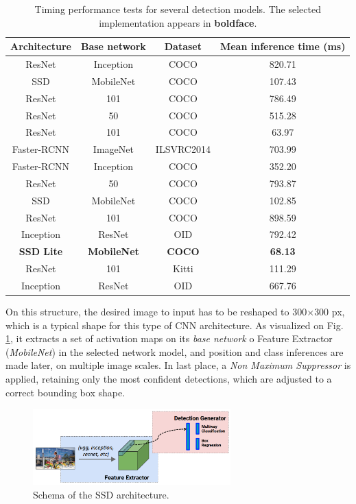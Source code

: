 \begin{table}[h]
	\centering
	\begin{tabular}{|c|c|c|c|}
		\hline
		\textbf{Architecture} & \textbf{Base network} & \textbf{Dataset} & \textbf{Mean inference time} (ms) \\ \hline
		ResNet  & Inception  & COCO & 820.71 \\ \hline
		SSD  & MobileNet  & COCO & 107.43 \\ \hline
		ResNet  & 101  & COCO & 786.49 \\ \hline
		ResNet  & 50  & COCO & 515.28 \\ \hline
		ResNet  & 101  & COCO & 63.97 \\ \hline
		Faster-RCNN  & ImageNet  & ILSVRC2014 & 703.99 \\ \hline
		Faster-RCNN  & Inception  & COCO & 352.20 \\ \hline
		ResNet  & 50  & COCO & 793.87 \\ \hline
		SSD  & MobileNet  & COCO & 102.85 \\ \hline
		ResNet  & 101  & COCO & 898.59 \\ \hline
		Inception  & ResNet  & OID & 792.42 \\ \hline
		\textbf{SSD Lite}  & \textbf{MobileNet}  & \textbf{COCO} & \textbf{68.13} \\ \hline
		ResNet  & 101  & Kitti & 111.29 \\ \hline
		Inception  & ResNet  & OID & 667.76 \\ \hline
	\end{tabular}
	\caption{Timing performance tests for several detection models. The selected implementation appears in \textbf{boldface}.}
	\label{tab:model_tests}
\end{table}

On this structure, the desired image to input has to be reshaped to 300$\times$300 px, which is a typical shape for this type of CNN architecture. As visualized on Fig. \ref{fig:perception_ssd}, it extracts a set of activation maps on its \emph{base network} o Feature Extractor (\emph{MobileNet}) in the selected network model, and position and class inferences are made later, on multiple image scales. In last place, a \emph{Non Maximum Suppressor} is applied, retaining only the most confident detections, which are adjusted to a correct bounding box shape.\\

\begin{figure}[h]
	\centering
	\includegraphics[width=3in]{images/SSD_schematic}
	\caption{Schema of the SSD architecture.}
	\label{fig:perception_ssd}
\end{figure}




